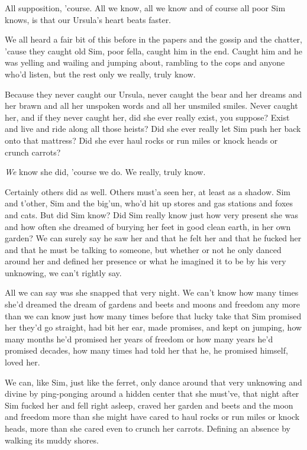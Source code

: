 All supposition, 'course. All we know, all we know and of course all poor Sim knows, is that our Ursula's heart beats faster.

We all heard a fair bit of this before in the papers and the gossip and the chatter, 'cause they caught old Sim, poor fella, caught him in the end. Caught him and he was yelling and wailing and jumping about, rambling to the cops and anyone who'd listen, but the rest only we really, truly know.

Because they never caught our Ursula, never caught the bear and her dreams and her brawn and all her unspoken words and all her unsmiled smiles. Never caught her, and if they never caught her, did she ever really exist, you suppose? Exist and live and ride along all those heists? Did she ever really let Sim push her back onto that mattress? Did she ever haul rocks or run miles or knock heads or crunch carrots?

\emph{We} know she did, 'course we do. We really, truly know.

Certainly others did as well. Others must'a seen her, at least as a shadow. Sim and t'other, Sim and the big'un, who'd hit up stores and gas stations and foxes and cats. But did Sim know? Did Sim really know just how very present she was and how often she dreamed of burying her feet in good clean earth, in her own garden? We can surely say he saw her and that he felt her and that he fucked her and that he must be talking to someone, but whether or not he only danced around her and defined her presence or what he imagined it to be by his very unknowing, we can't rightly say.

All we can say was she snapped that very night. We can't know how many times she'd dreamed the dream of gardens and beets and moons and freedom any more than we can know just how many times before that lucky take that Sim promised her they'd go straight, had bit her ear, made promises, and kept on jumping, how many months he'd promised her years of freedom or how many years he'd promised decades, how many times had told her that he, he promised himself, loved her.

We can, like Sim, just like the ferret, only dance around that very unknowing and divine by ping-ponging around a hidden center that she must've, that night after Sim fucked her and fell right asleep, craved her garden and beets and the moon and freedom more than she might have cared to haul rocks or run miles or knock heads, more than she cared even to crunch her carrots. Defining an absence by walking its muddy shores.

